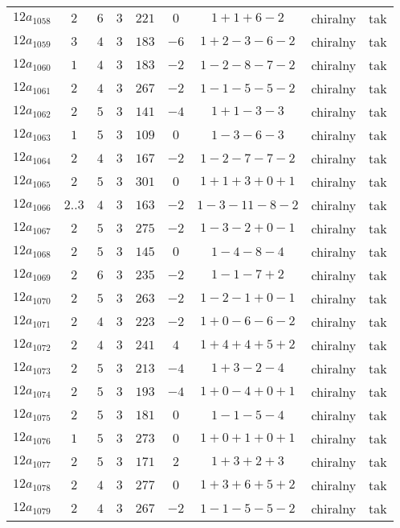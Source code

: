 \begin{longtable}{ccccccccc}
$12a_{1058}$ & $2$ & $6$ & $3$ & $221$ & $0$ & $1+1+6-2$ & chiralny & tak \\
$12a_{1059}$ & $3$ & $4$ & $3$ & $183$ & $-6$ & $1+2-3-6-2$ & chiralny & tak \\
$12a_{1060}$ & $1$ & $4$ & $3$ & $183$ & $-2$ & $1-2-8-7-2$ & chiralny & tak \\
$12a_{1061}$ & $2$ & $4$ & $3$ & $267$ & $-2$ & $1-1-5-5-2$ & chiralny & tak \\
$12a_{1062}$ & $2$ & $5$ & $3$ & $141$ & $-4$ & $1+1-3-3$ & chiralny & tak \\
$12a_{1063}$ & $1$ & $5$ & $3$ & $109$ & $0$ & $1-3-6-3$ & chiralny & tak \\
$12a_{1064}$ & $2$ & $4$ & $3$ & $167$ & $-2$ & $1-2-7-7-2$ & chiralny & tak \\
$12a_{1065}$ & $2$ & $5$ & $3$ & $301$ & $0$ & $1+1+3+0+1$ & chiralny & tak \\
$12a_{1066}$ & $2..3$ & $4$ & $3$ & $163$ & $-2$ & $1-3-11-8-2$ & chiralny & tak \\
$12a_{1067}$ & $2$ & $5$ & $3$ & $275$ & $-2$ & $1-3-2+0-1$ & chiralny & tak \\
$12a_{1068}$ & $2$ & $5$ & $3$ & $145$ & $0$ & $1-4-8-4$ & chiralny & tak \\
$12a_{1069}$ & $2$ & $6$ & $3$ & $235$ & $-2$ & $1-1-7+2$ & chiralny & tak \\
$12a_{1070}$ & $2$ & $5$ & $3$ & $263$ & $-2$ & $1-2-1+0-1$ & chiralny & tak \\
$12a_{1071}$ & $2$ & $4$ & $3$ & $223$ & $-2$ & $1+0-6-6-2$ & chiralny & tak \\
$12a_{1072}$ & $2$ & $4$ & $3$ & $241$ & $4$ & $1+4+4+5+2$ & chiralny & tak \\
$12a_{1073}$ & $2$ & $5$ & $3$ & $213$ & $-4$ & $1+3-2-4$ & chiralny & tak \\
$12a_{1074}$ & $2$ & $5$ & $3$ & $193$ & $-4$ & $1+0-4+0+1$ & chiralny & tak \\
$12a_{1075}$ & $2$ & $5$ & $3$ & $181$ & $0$ & $1-1-5-4$ & chiralny & tak \\
$12a_{1076}$ & $1$ & $5$ & $3$ & $273$ & $0$ & $1+0+1+0+1$ & chiralny & tak \\
$12a_{1077}$ & $2$ & $5$ & $3$ & $171$ & $2$ & $1+3+2+3$ & chiralny & tak \\
$12a_{1078}$ & $2$ & $4$ & $3$ & $277$ & $0$ & $1+3+6+5+2$ & chiralny & tak \\
$12a_{1079}$ & $2$ & $4$ & $3$ & $267$ & $-2$ & $1-1-5-5-2$ & chiralny & tak \\

\end{longtable}
